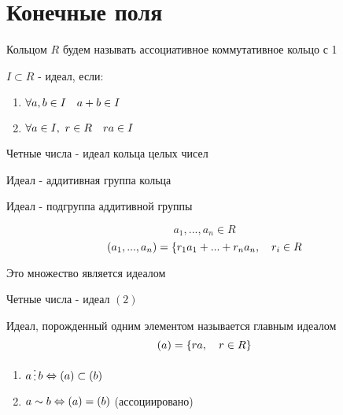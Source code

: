 \documentclass[main.tex]{subfiles}
\begin{document}
    \section{Конечные поля}
    Кольцом $R$ будем называть ассоциативное коммутативное кольцо с 1
    \begin{definition}
        $I \subset R$ - идеал, если:
        \begin{enumerate}
          \item $\forall a,b \in I \quad a + b \in I$
          \item $\forall a \in I,\ r \in R \quad ra \in I$
        \end{enumerate}
    \end{definition}

    \begin{example}
        Четные числа - идеал кольца целых чисел
    \end{example}

    \begin{remark}
        Идеал - аддитивная группа кольца

        Идеал - подгруппа аддитивной группы
    \end{remark}

    \begin{Definition}[конструкция]
        \[a_1,..., a_n \in R\]
        \[(a_1,...,a_n) = \{ r_1 a_1 + ... + r_n a_n,\quad r_i \in R\]
    \end{Definition}

    \begin{utv}
        Это множество является идеалом
    \end{utv}

    \begin{example}
        Четные числа - идеал $(2)$
    \end{example}

    \begin{definition}
        Идеал, порожденный одним элементом называется главным идеалом
        \[(a) = \{ ra,\quad r \in R\}\]
    \end{definition}

    \begin{properties}
        \begin{enumerate}
          \item $a \devides b \lra (a) \subset (b)$
          \item $a \sim b \Leftrightarrow (a) = (b)$ (ассоциировано)
        \end{enumerate}
    \end{properties}
\end{document}
